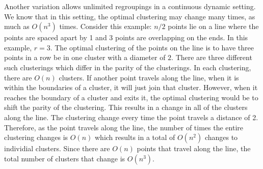 Another variation allows unlimited regroupings in a continuous dynamic setting.  We know that in this setting, the optimal clustering may change many times, as much as $O(n^3)$ times.  Consider this example: $n/2$ points lie on a line where the points are spaced apart by 1 and 3 points are overlapping on the ends.  In this example, $r = 3$.  The optimal clustering of the points on the line is to have three points in a row be in one cluster with a diameter of $2$.  There are three different such clusterings which differ in the parity of the clusterings.  In each clustering, there are $O(n)$ clusters.  If another point travels along the line, when it is within the boundaries of a cluster, it will just join that cluster.  However, when it reaches the boundary of a cluster and exits it, the optimal clustering would be to shift the parity of the clustering.  This results in a change in all of the clusters along the line.  The clustering change every time the point travels a distance of 2.  Therefore, as the point travels along the line, the number of times the entire clustering changes is $O(n)$ which results in a total of $O(n^2)$ changes to individial clusters.  Since there are $O(n)$ points that travel along the line, the total number of clusters that change is $O(n^3)$.